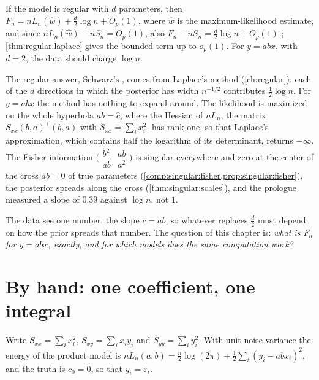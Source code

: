 \begin{refsection}
\begin{regularanswer}
If the model is regular with $d$ parameters, then $F_n=nL_n(\hat w)+\tfrac d2\log n+O_p(1)$, where $\hat w$ is the maximum-likelihood estimate, and since $nL_n(\hat w)-nS_n=O_p(1)$, also $F_n-nS_n=\tfrac d2\log n+O_p(1)$ \parencite{Schwarz1978}; \cref{thm:regular:laplace} gives the bounded term up to $o_p(1)$. For $y=abx$, with $d=2$, the data should charge $\log n$.
\end{regularanswer}

The regular answer, Schwarz's , comes from Laplace's method (\cref{ch:regular}): each of the $d$ directions in which the posterior has width $n^{-1/2}$ contributes $\tfrac12\log n$. For $y=abx$ the method has nothing to expand around. The likelihood is maximized on the whole hyperbola $ab=\hat c$, where the Hessian of $nL_n$, the matrix $S_{xx}(b,a)^\top(b,a)$ with $S_{xx}=\sum_ix_i^2$, has rank one, so that Laplace's approximation, which contains half the logarithm of its determinant, returns $-\infty$. The Fisher information $\bigl(\begin{smallmatrix}b^2&ab\\ab&a^2\end{smallmatrix}\bigr)$ is singular everywhere and zero at the center of the cross $ab=0$ of true parameters (\cref{comp:singular:fisher,prop:singular:fisher}), the posterior spreads along the cross (\cref{thm:singular:scales}), and the prologue measured a slope of $0.39$ against $\log n$, not $1$.

The data see one number, the slope $c=ab$, so whatever replaces $\tfrac d2$ must depend on how the prior spreads that number. The question of this chapter is: \emph{what is $F_n$ for $y=abx$, exactly, and for which models does the same computation work?}

\section{By hand: one coefficient, one integral}\label{sec:coefficient:byhand}

Write $S_{xx}=\sum_ix_i^2$, $S_{xy}=\sum_ix_iy_i$ and $S_{yy}=\sum_iy_i^2$. With unit noise variance the energy of the product model is $nL_n(a,b)=\tfrac n2\log(2\pi)+\tfrac12\sum_i(y_i-abx_i)^2$, and the truth is $c_0=0$, so that $y_i=\varepsilon_i$.


\end{refsection}
